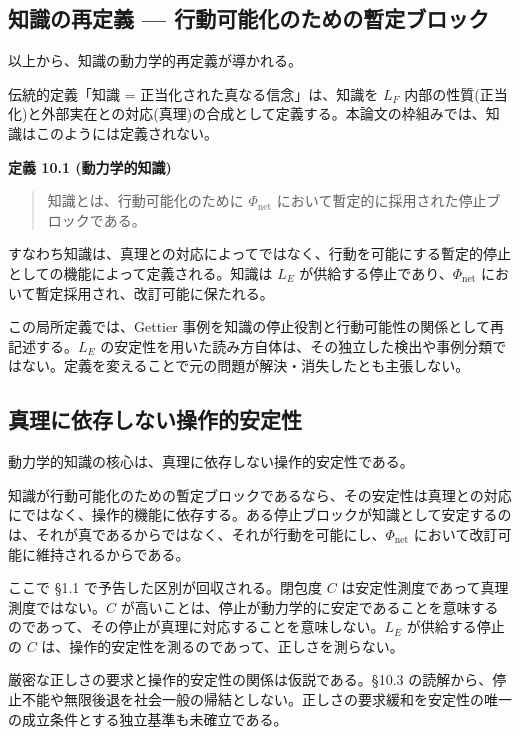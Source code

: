 \bigskip


\subsection{知識の再定義 — 行動可能化のための暫定ブロック}


以上から、知識の動力学的再定義が導かれる。

伝統的定義「知識 = 正当化された真なる信念」は、知識を $L_F$ 内部の性質(正当化)と外部実在との対応(真理)の合成として定義する。本論文の枠組みでは、知識はこのようには定義されない。

\textbf{定義 10.1 (動力学的知識)}

\begin{quote}
知識とは、行動可能化のために $\Phi_{\text{net}}$ において暫定的に採用された停止ブロックである。
\end{quote}


すなわち知識は、真理との対応によってではなく、行動を可能にする暫定的停止としての機能によって定義される。知識は $L_E$ が供給する停止であり、$\Phi_{\text{net}}$ において暫定採用され、改訂可能に保たれる。

この局所定義では、Gettier 事例を知識の停止役割と行動可能性の関係として再記述する。$L_E$ の安定性を用いた読み方自体は、その独立した検出や事例分類ではない。定義を変えることで元の問題が解決・消失したとも主張しない。

\bigskip


\subsection{真理に依存しない操作的安定性}


動力学的知識の核心は、真理に依存しない操作的安定性である。

知識が行動可能化のための暫定ブロックであるなら、その安定性は真理との対応にではなく、操作的機能に依存する。ある停止ブロックが知識として安定するのは、それが真であるからではなく、それが行動を可能にし、$\Phi_{\text{net}}$ において改訂可能に維持されるからである。

ここで \S{}1.1 で予告した区別が回収される。閉包度 $C$ は安定性測度であって真理測度ではない。$C$ が高いことは、停止が動力学的に安定であることを意味するのであって、その停止が真理に対応することを意味しない。$L_E$ が供給する停止の $C$ は、操作的安定性を測るのであって、正しさを測らない。

厳密な正しさの要求と操作的安定性の関係は仮説である。\S{}10.3 の読解から、停止不能や無限後退を社会一般の帰結としない。正しさの要求緩和を安定性の唯一の成立条件とする独立基準も未確立である。

